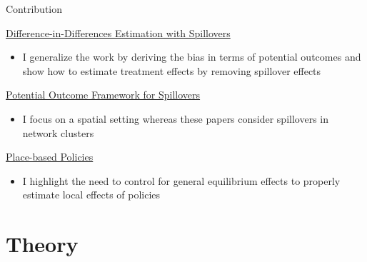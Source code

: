 \documentclass[aspectratio=169]{beamer}
\begin{document}


\begin{frame}{Contribution}

    {\footnotesize
    
    \underline{Difference-in-Differences Estimation with Spillovers} 
    
    \begin{citecolor}
    \end{citecolor}
    
    \begin{itemize}
        \item I generalize the work by deriving the bias in terms of potential outcomes and show how to estimate treatment effects by removing spillover effects
    \end{itemize}


    \pause
    \underline{Potential Outcome Framework for Spillovers}
    
    \begin{citecolor}
    \end{citecolor}

    \begin{itemize}
        \item I focus on a spatial setting whereas these papers consider spillovers in network clusters
    \end{itemize}


    \pause
    \underline{Place-based Policies}

    \begin{citecolor}
    \end{citecolor}

    \begin{itemize}
        \item I highlight the need to control for general equilibrium effects to properly estimate local effects of policies
    \end{itemize}
    }
\end{frame}


\section{Theory}
\end{document}
